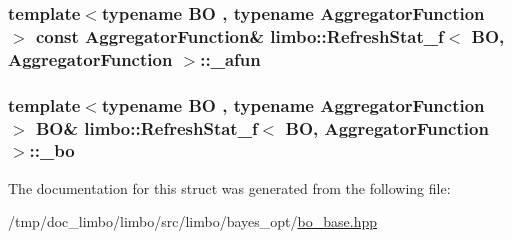 \subsubsection[{\texorpdfstring{\+\_\+afun}{_afun}}]{\setlength{\rightskip}{0pt plus 5cm}template$<$typename BO , typename Aggregator\+Function $>$ const Aggregator\+Function\& {\bf limbo\+::\+Refresh\+Stat\+\_\+f}$<$ BO, Aggregator\+Function $>$\+::\+\_\+afun}\hypertarget{structlimbo_1_1_refresh_stat__f_af02fdc84a4066c199d26e823b9887531}{}\label{structlimbo_1_1_refresh_stat__f_af02fdc84a4066c199d26e823b9887531}
\subsubsection[{\texorpdfstring{\+\_\+bo}{_bo}}]{\setlength{\rightskip}{0pt plus 5cm}template$<$typename BO , typename Aggregator\+Function $>$ BO\& {\bf limbo\+::\+Refresh\+Stat\+\_\+f}$<$ BO, Aggregator\+Function $>$\+::\+\_\+bo}\hypertarget{structlimbo_1_1_refresh_stat__f_ad94ccf3c46dbed8e9f8ab573af8fb258}{}\label{structlimbo_1_1_refresh_stat__f_ad94ccf3c46dbed8e9f8ab573af8fb258}


The documentation for this struct was generated from the following file\+:\begin{DoxyCompactItemize}
\item 
/tmp/doc\+\_\+limbo/limbo/src/limbo/bayes\+\_\+opt/\hyperlink{bo__base_8hpp}{bo\+\_\+base.\+hpp}\end{DoxyCompactItemize}
